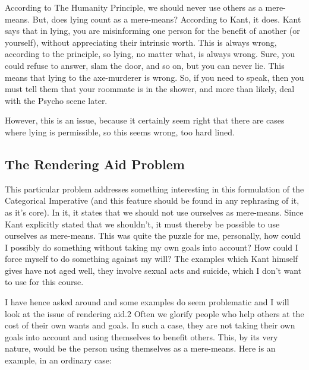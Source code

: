 According to The Humanity Principle, we should never use others as a mere-means. But, does lying count as a mere-means? According to Kant, it does. Kant says that in lying, you are misinforming one person for the benefit of another (or yourself), without appreciating their intrinsic worth. This is always wrong, according to the principle, so lying, no matter what, is always wrong. Sure, you could refuse to answer, slam the door, and so on, but you can never lie. This means that lying to the axe-murderer is wrong. So, if you need to speak, then you must tell them that your roommate is in the shower, and more than likely, deal with the Psycho scene later. 

However, this is an issue, because it certainly seem right that there are cases where lying is permissible, so this seems wrong, too hard lined. 
\subsection{The Rendering Aid Problem}

This particular problem addresses something interesting in this formulation of the Categorical Imperative (and this feature should be found in any rephrasing of it, as it's core). In it, it states that we should not use ourselves as mere-means. Since Kant explicitly stated that we shouldn't, it must thereby be possible to use ourselves as mere-means. This was quite the puzzle for me, personally, how could I possibly do something without taking my own goals into account? How could I force myself to do something against my will? The examples which Kant himself gives have not aged well, they involve sexual acts and suicide, which I don't want to use for this course. 

I have hence asked around and some examples do seem problematic and I will look at the issue of rendering aid.2 Often we glorify people who help others at the cost of their own wants and goals. In such a case, they are not taking their own goals into account and using themselves to benefit others. This, by its very nature, would be the person using themselves as a mere-means. Here is an example, in an ordinary case:


